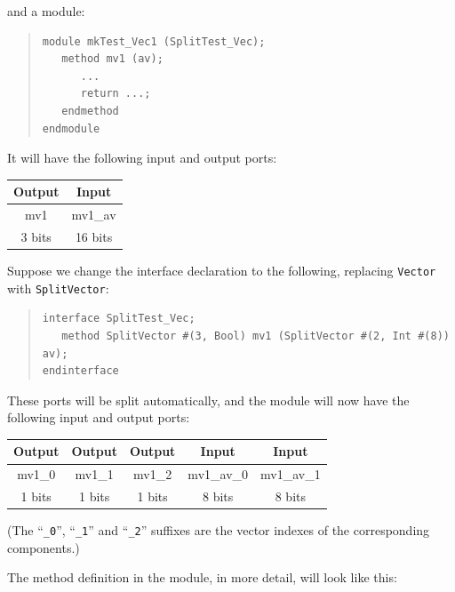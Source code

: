 and a module:

\begin{quote}
\begin{verbatim}
module mkTest_Vec1 (SplitTest_Vec);
   method mv1 (av);
      ...
      return ...;
   endmethod
endmodule
\end{verbatim}
\end{quote}

It will have the following input and output ports:

\begin{center}
  \begin{tabular}{|c||c|}
    \hline
     Output &
     Input  \\
    \hline
     mv1     &
     mv1\_av \\
     3  bits &
     16 bits \\
    \hline
  \end{tabular}
\end{center}

Suppose we change the interface declaration to the following,
replacing {\tt Vector} with {\tt SplitVector}:

\begin{quote}
\begin{verbatim}
interface SplitTest_Vec;
   method SplitVector #(3, Bool) mv1 (SplitVector #(2, Int #(8)) av);
endinterface
\end{verbatim}
\end{quote}

These ports will be split automatically, and the module will now have
the following input and output ports:

\begin{center}
  \begin{tabular}{|c|c|c||c|c|}
    \hline
     Output &
     Output &
     Output &
     Input  &
     Input  \\
    \hline
     mv1\_0      &
     mv1\_1      &
     mv1\_2      &
     mv1\_av\_0  &
     mv1\_av\_1  \\
     1  bits   &
     1  bits   &
     1  bits   &
     8  bits   &
     8  bits   \\
    \hline
  \end{tabular}

  {\footnotesize (The ``{\tt \_0}'', ``{\tt \_1}'' and ``{\tt \_2}''
    suffixes are the vector indexes of the corresponding components.)}

\end{center}

The method definition in the module, in more detail, will look like this:

